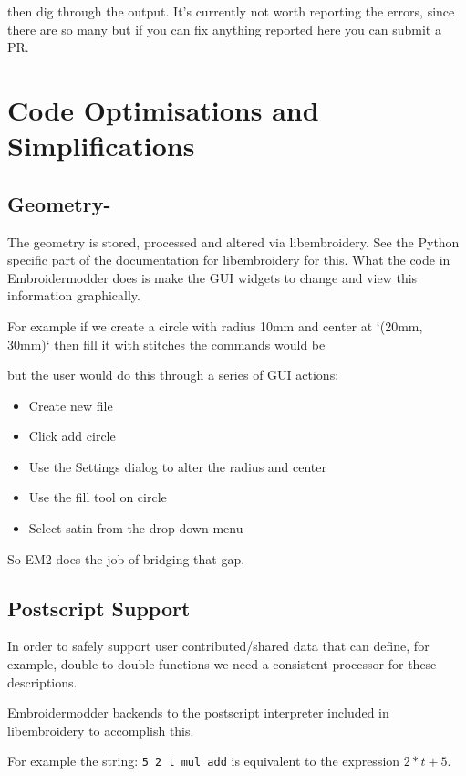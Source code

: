 \documentclass[a4paper]{report}
\begin{document}
then dig through the output. It's currently not worth reporting the errors, since
there are so many but if you can fix anything reported here you can submit a PR.

\section{Code Optimisations and Simplifications}

\subsection{Geometry-}

The geometry is stored, processed and altered via libembroidery. See the Python specific part
of the documentation for libembroidery for this. What the code in Embroidermodder does is make
the GUI widgets to change and view this information graphically.

For example if we create a circle with radius 10mm and center at `(20mm, 30mm)` then fill it
with stitches the commands would be



but the user would do this through a series of GUI actions:

\begin{itemize}
\item Create new file
\item Click add circle
\item Use the Settings dialog to alter the radius and center
\item Use the fill tool on circle
\item Select satin from the drop down menu
\end{itemize}

So EM2 does the job of bridging that gap.

\subsection{Postscript Support}

In order to safely support user contributed/shared data that can define, for
example, double to double functions we need a consistent processor for these
descriptions.

Embroidermodder backends to the postscript interpreter included in libembroidery
to accomplish this.

For example the string: \texttt{5 2 t mul add} is equivalent to
the expression $2*t + 5$.
\end{document}
